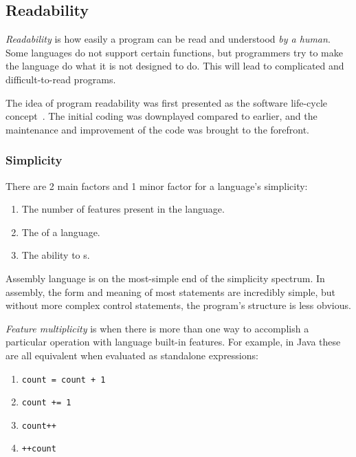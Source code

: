 \subsection{Readability}\label{subsec:Readability}
\begin{definition}[Readability]\label{def:Readability}
  \emph{Readability} is how easily a program can be read and understood \emph{by a human}.
  Some languages do not support certain functions, but programmers try to make the language do what it is not designed to do.
  This will lead to complicated and difficult-to-read programs.
  
  The idea of program readability was first presented as the software life-cycle concept~\parencite{Booch1987}.
  The initial coding was downplayed compared to earlier, and the maintenance and improvement of the code was brought to the forefront.
\end{definition}

\subsubsection{Simplicity}\label{subsubsec:Simplicity}
There are 2 main factors and 1 minor factor for a language's simplicity:
\begin{enumerate}[noitemsep]
\item The number of features present in the language.
\item The  of a language.
\item The ability to s.
\end{enumerate}

Assembly language is on the most-simple end of the simplicity spectrum.
In assembly, the form and meaning of most statements are incredibly simple, but without more complex control statements, the program's structure is less obvious.

\begin{definition}\label{def:Feature_Multiplicity}
  \emph{Feature multiplicity} is when there is more than one way to accomplish a particular operation with language built-in features.
  For example, in Java these are all equivalent when evaluated as standalone expressions:
  \begin{enumerate}[noitemsep]
  \item \texttt{count = count + 1}
  \item \texttt{count += 1}
  \item \texttt{count++}
  \item \texttt{++count}
  \end{enumerate}
\end{definition}


